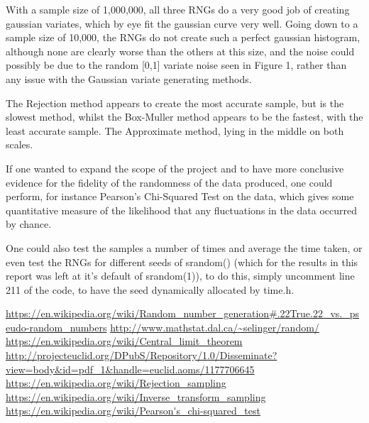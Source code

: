 \documentclass{article}
\begin{document}
With a sample size of 1,000,000, all three RNGs do a very good job of creating gaussian variates, which by eye fit the gaussian curve very well. Going down to a sample size of 10,000, the RNGs do not create such a perfect gaussian histogram, although none are clearly worse than the others at this size, and the noise could possibly be due to the random [0,1] variate noise seen in Figure 1, rather than any issue with the Gaussian variate generating methods.

The Rejection method appears to create the most accurate sample, but is the slowest method, whilst the Box-Muller method appears to be the fastest, with the least accurate sample. The Approximate method, lying in the middle on both scales.

If one wanted to expand the scope of the project and to have more conclusive evidence for the fidelity of the randomness of the data produced, one could perform, for instance Pearson's Chi-Squared Test on the data, which gives some quantitative measure of the likelihood that any fluctuations in the data occurred by chance\cite{Test}.

One could also test the samples a number of times and average the time taken, or even test the RNGs for different seeds of srandom() (which for the results in this report was left at it's default of srandom(1)), to do this, simply uncomment line 211 of the code, to have the seed dynamically allocated by time.h.





\begin{thebibliography}{9}
\url{https://en.wikipedia.org/wiki/Random_number_generation#.22True.22_vs._pseudo-random_numbers}
\url{http://www.mathstat.dal.ca/~selinger/random/}
\url{https://en.wikipedia.org/wiki/Central_limit_theorem}
\url{http://projecteuclid.org/DPubS/Repository/1.0/Disseminate?view=body&id=pdf_1&handle=euclid.aoms/1177706645}
\url{https://en.wikipedia.org/wiki/Rejection_sampling}
\url{https://en.wikipedia.org/wiki/Inverse_transform_sampling}
\url{https://en.wikipedia.org/wiki/Pearson's_chi-squared_test}

\end{thebibliography}
\end{document}
